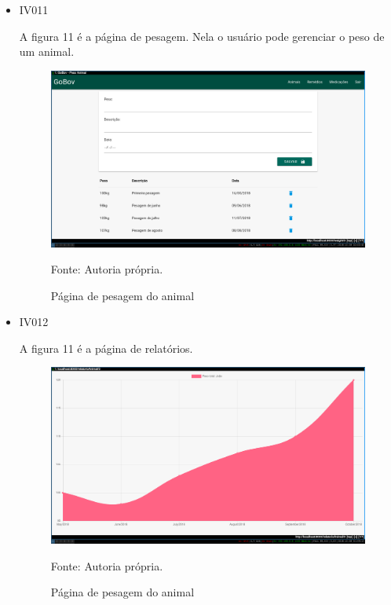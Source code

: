 \begin{itemize}
\newpage
\item IV011

A figura 11 é a página de pesagem. Nela o usuário pode gerenciar o peso de um animal.
\begin{figure}[H]
	\begin{center}
		\caption{Página de pesagem do animal}
		\includegraphics[width=13cm]{../img/prototipos/addPeso.png}

		Fonte: Autoria própria.
	\end{center}
\end{figure}

\item IV012

A figura 11 é a página de relatórios.
\begin{figure}[H]
	\begin{center}
		\caption{Página de pesagem do animal}
		\includegraphics[width=13cm]{../img/prototipos/relatorio.png}

		Fonte: Autoria própria.
	\end{center}
\end{figure}

\end{itemize}
